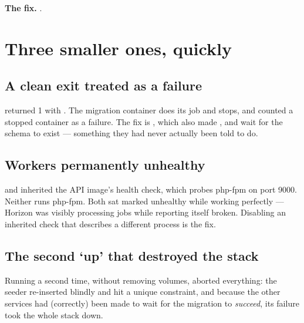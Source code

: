 \textbf{The fix.} .


\section{Three smaller ones, quickly}

\subsection{A clean exit treated as a failure}

 returned 1 with . The
migration container does its job and stops, and  counted a stopped
container as a failure. The fix is , which also made , 
and  wait for the schema to exist --- something they had never
actually been told to do.

\subsection{Workers permanently unhealthy}

 and  inherited the API image's health check,
which probes php-fpm on port 9000. Neither runs php-fpm. Both sat marked
unhealthy while working perfectly --- Horizon was visibly processing jobs while
reporting itself broken. Disabling an inherited check that describes a different
process is the fix.

\subsection{The second `up' that destroyed the stack}

Running  a second time, without removing volumes,
aborted everything: the seeder re-inserted blindly and hit a unique constraint,
and because the other services had (correctly) been made to wait for the
migration to \emph{succeed}, its failure took the whole stack down.

